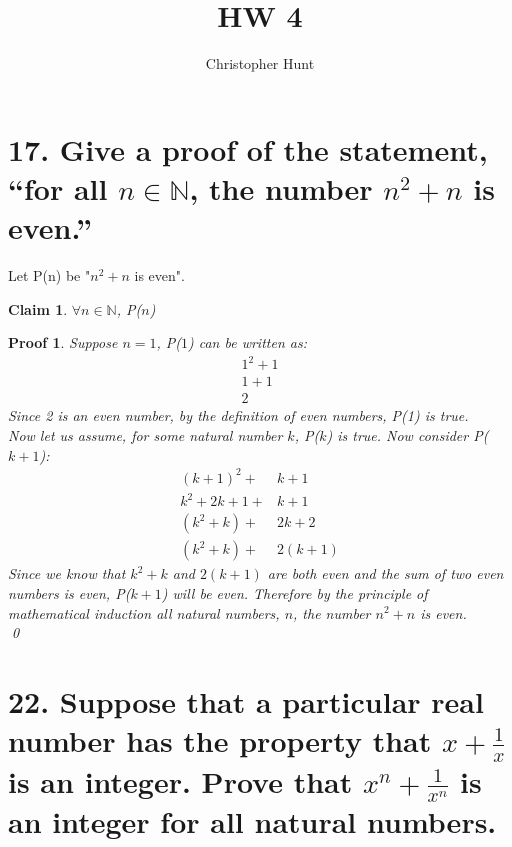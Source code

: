 \documentclass{article}
\title{HW 4}
\author{Christopher Hunt}
\date{}
\newtheorem*{claim}{Claim}
\newtheorem*{poof}{Proof}
\begin{document}
\pagestyle{fancy}
\fancyhf{}
\rhead{\thepage}

\maketitle

\section*{17. Give a proof of the statement, “for all $n\in \mathbb{N}$, the number $n^2+n$ is even.”}
Let P(n) be "$n^2 + n$ is even".
\begin{claim}
    $\forall n \in \mathbb{N}$, P($n$)
\end{claim}
\begin{poof}
    Suppose  $n=1$, P($1$) can be written as:
    \begin{align*}
        1^2+1\\
        1+1\\
        2
    \end{align*}
    Since 2 is an even number, by the definition of even numbers, P(1) is true.\\
    
    \noindent Now let us assume, for some natural number $k$, P($k$) is true.
    Now consider P($k+1$):
    \begin{align*}
        (k+1)^2+&k+1\\
        k^2+2k+1+&k+1\\
        (k^2+k)+&2k+2\\
        (k^2+k)+&2(k+1)
    \end{align*}
    Since we know that $k^2+k$ and $2(k+1)$ are both even and the sum of two even numbers is even, P($k+1$) will be even.
    Therefore by the principle of mathematical induction all natural numbers, $n$, the number $n^2+n$ is even.
    \\
    \qed
\end{poof}
\newpage
\section*{22. Suppose that a particular real number 
 has the property that $x+\frac{1}{x}$ is an integer. Prove that $x^n+\frac{1}{x^n}$ is an integer for all natural numbers.}
\end{document}
